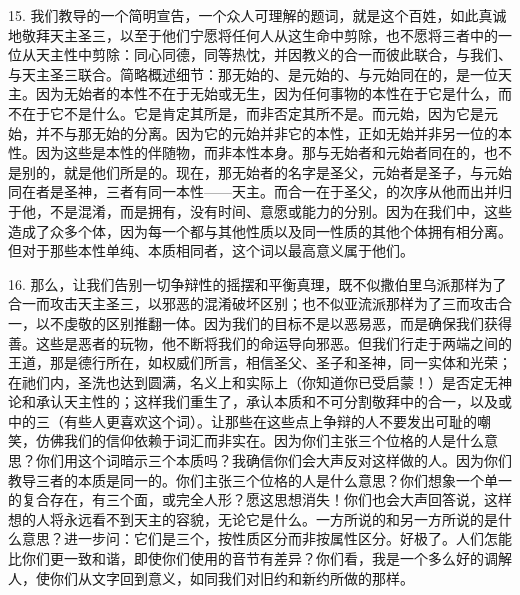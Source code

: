 15. 我们教导的一个简明宣告，一个众人可理解的题词，就是这个百姓，如此真诚地敬拜天主圣三，以至于他们宁愿将任何人从这生命中剪除，也不愿将三者中的一位从天主性中剪除：同心同德，同等热忱，并因教义的合一而彼此联合，与我们、与天主圣三联合。简略概述细节：那无始的、是元始的、与元始同在的，是一位天主。因为无始者的本性不在于无始或无生，因为任何事物的本性在于它是什么，而不在于它不是什么。它是肯定其所是，而非否定其所不是。而元始，因为它是元始，并不与那无始的分离。因为它的元始并非它的本性，正如无始并非另一位的本性。因为这些是本性的伴随物，而非本性本身。那与无始者和元始者同在的，也不是别的，就是他们所是的。现在，那无始者的名字是圣父，元始者是圣子，与元始同在者是圣神，三者有同一本性——天主。而合一在于圣父，的次序从他而出并归于他，不是混淆，而是拥有，没有时间、意愿或能力的分别。因为在我们中，这些造成了众多个体，因为每一个都与其他性质以及同一性质的其他个体拥有相分离。但对于那些本性单纯、本质相同者，这个词以最高意义属于他们。\par

16. 那么，让我们告别一切争辩性的摇摆和平衡真理，既不似撒伯里乌派那样为了合一而攻击天主圣三，以邪恶的混淆破坏区别；也不似亚流派那样为了三而攻击合一，以不虔敬的区别推翻一体。因为我们的目标不是以恶易恶，而是确保我们获得善。这些是恶者的玩物，他不断将我们的命运导向邪恶。但我们行走于两端之间的王道，那是德行所在，如权威们所言，相信圣父、圣子和圣神，同一实体和光荣；在祂们内，圣洗也达到圆满，名义上和实际上（你知道你已受启蒙！）是否定无神论和承认天主性的；这样我们重生了，承认本质和不可分割敬拜中的合一，以及或中的三（有些人更喜欢这个词）。让那些在这些点上争辩的人不要发出可耻的嘲笑，仿佛我们的信仰依赖于词汇而非实在。因为你们主张三个位格的人是什么意思？你们用这个词暗示三个本质吗？我确信你们会大声反对这样做的人。因为你们教导三者的本质是同一的。你们主张三个位格的人是什么意思？你们想象一个单一的复合存在，有三个面，或完全人形？愿这思想消失！你们也会大声回答说，这样想的人将永远看不到天主的容貌，无论它是什么。一方所说的和另一方所说的是什么意思？进一步问：它们是三个，按性质区分而非按属性区分。好极了。人们怎能比你们更一致和谐，即使你们使用的音节有差异？你们看，我是一个多么好的调解人，使你们从文字回到意义，如同我们对旧约和新约所做的那样。\par

